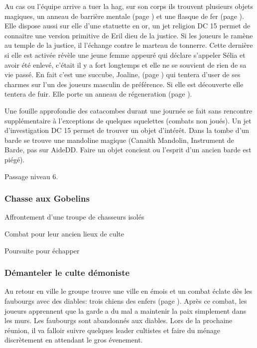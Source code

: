 Au cas ou l'équipe arrive a tuer la hag, sur son corps ils trouvent plusieurs objets magiques, un 
anneau de barrière mentale (page \pageref{AnneauBarriereMentale})
et une flasque de fer (page \pageref{FlasqueFer}). Elle dispose aussi sur elle d'une statuette en
or, un jet religion DC 15 permet de connaitre une version primitive de Eril dieu de la justice.
Si les joueurs le ramène au temple de la justice, il l'échange contre le marteau de tonnerre.
Cette dernière si elle est activée 
révèle une jeune femme appeuré qui déclare
s'appeler Sélia et avoir été enlevé, c'était il y a fort longtemps et elle ne se souvient de rien
de sa vie passé. En fait c'est une succube, Joaline, (page \pageref{Succube}) qui 
tentera d'user de ses charmes sur l'un des joueurs
masculin de préférence. Si elle est découverte elle tentera de fuir. Elle porte un anneau de 
régeneration (page \pageref{AnneauRegeneration}).

Une fouille approfondie des catacombes durant une journée se fait sans rencontre supplémentaire
à l'exceptions de quelques squelettes (combats non joués). Un jet d'investigation DC 15 permet
de trouver un objet d'intérêt. Dans la tombe d'un barde se trouve une mandoline magique
(Canaith Mandolin, Instrument de Barde, pas sur AideDD. Faire un objet concient ou l'esprit d'un
ancien barde est piégé).

Passage niveau 6.

\subsubsection*{Chasse aux Gobelins}

Affrontement d'une troupe de chasseurs isolés

Combat pour leur ancien lieux de culte 

Poursuite pour échapper

\subsubsection*{Démanteler le culte démoniste}

Au retour en ville le groupe trouve une ville en émois et un combat éclate dès 
les faubourgs avec des diables: trois chiens des enfers 
(page \pageref{ChienEnfers}). Après ce combat, les joueurs apprennent
que la garde a du mal a maintenir la paix simplement dans les murs. Les faubourgs 
sont abandonnés aux diables. Lors de la prochaine réunion, il va falloir suivre
quelques leader cultistes et faire du ménage discrètement en attendant le gros 
évenement. 

